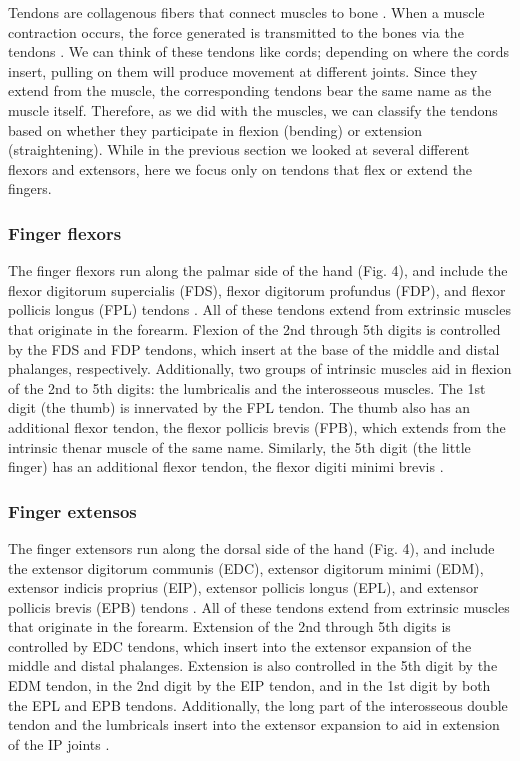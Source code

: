 \documentclass{article}
\begin{document}
Tendons are collagenous fibers that connect muscles to bone \citep{tortora2018principles}. When a muscle contraction occurs, the force generated is transmitted to the bones via the tendons \citep{kirkendall1997function}. We can think of these tendons like cords; depending on where the cords insert, pulling on them will produce movement at different joints. Since they extend from the muscle, the corresponding tendons bear the same name as the muscle itself. Therefore, as we did with the muscles, we can classify the tendons based on whether they participate in flexion (bending) or extension (straightening). While in the previous section we looked at several different flexors and extensors, here we focus only on tendons that flex or extend the fingers.

\subsubsection{Finger flexors}

The finger flexors run along the palmar side of the hand (Fig. 4), and include the flexor digitorum supercialis (FDS), flexor digitorum profundus (FDP), and flexor pollicis longus (FPL) tendons \citep{tortora2018principles, ombregt2013applied}. All of these tendons extend from extrinsic muscles that originate in the forearm. Flexion of the 2nd through 5th digits is controlled by the FDS and FDP tendons, which insert at the base of the middle and distal phalanges, respectively. Additionally, two groups of intrinsic muscles aid in flexion of the 2nd to 5th digits: the lumbricalis and the interosseous muscles. The 1st digit (the thumb) is innervated by the FPL tendon. The thumb also has an additional flexor tendon, the flexor pollicis brevis (FPB), which extends from the intrinsic thenar muscle of the same name. Similarly, the 5th digit (the little finger) has an additional flexor tendon, the flexor digiti minimi brevis \citep{tortora2018principles}.

\subsubsection{Finger extensos}

The finger extensors run along the dorsal side of the hand (Fig. 4), and include the extensor digitorum communis (EDC), extensor digitorum minimi (EDM), extensor indicis proprius (EIP), extensor pollicis longus (EPL), and extensor pollicis brevis (EPB) tendons \citep{tortora2018principles, ombregt2013applied}. All of these tendons extend from extrinsic muscles that originate in the forearm. Extension of the 2nd through 5th digits is controlled by EDC tendons, which insert into the extensor expansion of the middle and distal phalanges. Extension is also controlled in the 5th digit by the EDM tendon, in the 2nd digit by the EIP tendon, and in the 1st digit by both the EPL and EPB tendons. Additionally, the long part of the interosseous double tendon and the lumbricals insert into the extensor expansion to aid in extension of the IP joints \citep{ombregt2013applied}.
\end{document}
